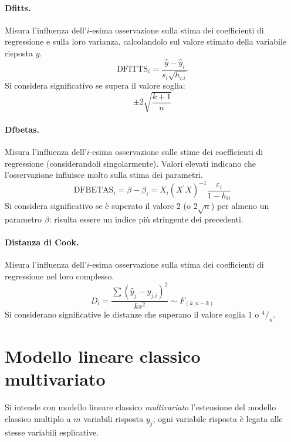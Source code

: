 \documentclass[a4page, 11pt]{article} %
\begin{document}
\paragraph{Dfitts.} Misura l’influenza dell'$i$-esima osservazione sulla stima dei coefficienti di regressione e sulla loro varianza, calcolandolo sul valore stimato della variabile risposta $y$.
\begin{equation*}
\text{DFITTS}_i = \frac{\hat{y} - \hat{y}_i}{s_i\sqrt{h_{i.i}}}
\end{equation*}
Si considera significativo se supera il valore soglia:
\begin{equation*}
\pm 2 \sqrt{\frac{k+1}{n}}
\end{equation*}

\paragraph{Dfbetas.} Misura l’influenza dell'$i$-esima osservazione sulle stime dei coefficienti di regressione (considerandoli singolarmente).
Valori elevati indicano che l'osservazione influisce molto sulla stima dei parametri.
\begin{equation*}
\text{DFBETAS}_i = \beta - \beta_i = X_i(X^{\prime}X)^{-1}\frac{\varepsilon_i}{1-h_{ii}}
\end{equation*}
Si considera significativo se è superato il valore $2$ (o $2 \sqrt{n}$) per almeno un parametro $\beta$: risulta essere un indice più stringente dei precedenti.

\paragraph{Distanza di Cook.} Misura l’influenza dell'$i$-esima osservazione sulla stima dei coefficienti di regressione nel loro complesso.
\begin{equation*}
D_i = \frac{\sum(\hat{y}_j - \hat{y}_{j.i})^2}{k s^2} \sim F_{(k, n-k)}
\end{equation*}
Si considerano significative le distanze che superano il valore soglia $1$ o $^4/_n$.


\section{Modello lineare classico multivariato}
Si intende con modello lineare classico \textit{multivariato} l'estensione del modello classico multiplo a $m$ variabili risposta $y_j$; ogni variabile risposta è legata alle stesse variabili esplicative.
\end{document}
